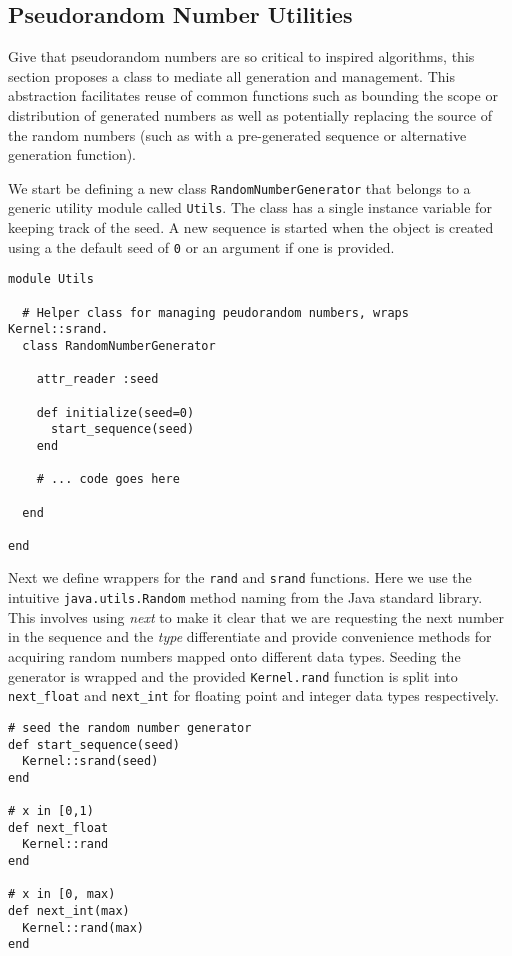 \subsection{Pseudorandom Number Utilities}
Give that pseudorandom numbers are so critical to inspired algorithms, this section proposes a class to mediate all generation and management. This abstraction facilitates reuse of common functions such as bounding the scope or distribution of generated numbers as well as potentially replacing the source of the random numbers (such as with a pre-generated sequence or alternative generation function).

We start be defining a new class \texttt{RandomNumberGenerator} that belongs to a generic utility module called \texttt{Utils}. The class has a single instance variable for keeping track of the seed. A new sequence is started when the object is created using a the default seed of \texttt{0} or an argument if one is provided.

\begin{lstlisting}
module Utils
  
  # Helper class for managing peudorandom numbers, wraps Kernel::srand. 
  class RandomNumberGenerator
	
	attr_reader :seed
    
    def initialize(seed=0)
      start_sequence(seed)
    end
	
	# ... code goes here
	
  end

end
\end{lstlisting}

Next we define wrappers for the \texttt{rand} and \texttt{srand} functions. Here we use the intuitive \texttt{java.utils.Random} method naming from the Java standard library. This involves using \emph{next} to make it clear that we are requesting the next number in the sequence and the \emph{type} differentiate and provide convenience methods for acquiring random numbers mapped onto different data types. Seeding the generator is wrapped and the provided \texttt{Kernel.rand} function is split into \texttt{next\_float} and \texttt{next\_int} for floating point and integer data types respectively.

\begin{lstlisting}
# seed the random number generator
def start_sequence(seed)
  Kernel::srand(seed)
end

# x in [0,1)
def next_float
  Kernel::rand
end

# x in [0, max)
def next_int(max)
  Kernel::rand(max)
end
\end{lstlisting}

